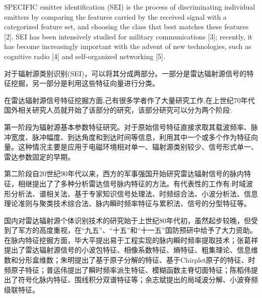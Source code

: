 SPECIFIC emitter identification (SEI) is the process of discriminating individual emitters by comparing the features carried by the received signal with a categorized feature set, and choosing the class that best matches these features [2].
SEI has been intensively studied for military communications [3]; recently, it has become increasingly important with the advent of new technologies, such as cognitive radio [4] and self-organized networking [5].


对于辐射源类别识别(SEI)，可以将其分成两部分。一部分是雷达辐射源信号的特征挖掘，另一部分是利用这些特征向量进行分类。

在雷达辐射源信号特征挖掘方面,己有很多学者作了大量研究工作,在上世纪70年代国外相关研究人员就开始了该部分的研究\cite{therrien1974application}，该部分研究可以分为两个阶段:

第一阶段为辐射源基本参数特征研究。对于原始信号特征直接求取其载波频率、脉冲宽度、脉冲幅度、到达角度和到达时间等信息\cite{徐欣2001雷达截获系统实时信号分选处理技术研究}，利用其中一个或多个作为特征向量。这种情况主要是应用于电磁环境相对单一、辐射源类别较少、信号形式单一、雷达参数固定的早期。

第二阶段自20世纪90年代以来，西方的军事强国开始研究雷达辐射信号的脉内特征，相继提出了了多种分析雷达信号脉内特征的方法。有代表性的工作有:时域波形分析法\cite{roe1994real}、谱相关法\cite{jouny1995radar,zhang2001new}、基于专家知识信号处理法\cite{melvin2006knowledge,roe1990knowledge,capraro2006knowledge}、时频综合法\cite{rose1996emitter,chen1999joint,li2011quadratic,moraitakis2000feature}、小波分析法\cite{cohen2002importance}、信息理论准则与聚类技术综合法\cite{zhou1999combining}、脉内瞬时频率特征\cite{kawalec2004radar}与累积法\cite{aubry2011cumulants}、信号的分型特征等\cite{dudczyk2013identification,zhang2003fractal,dudczyk2013fractal}。

国内对雷达辐射源个体识别技术的研究始于上世纪80年代初，虽然起步较晚，但受到了军方的高度重视，在“九五”、“十五”和“十一五”国防预研中给予了大力资助。在脉内特征挖掘方面，毕大平提出易于工程实现的脉内瞬时频率提取技术\cite{毕大平2005基于瞬时频率的脉内调制识别技术}；张葛祥提出了雷达辐射源信号的小波包特征\cite{张葛祥2006基于小波包变换和特征选择的雷达辐射源信号识别}、相像系数特征\cite{张葛祥2005基于相像系数的雷达辐射源信号特征选择}、熵特征\cite{张葛祥2005基于熵特征的雷达辐射源信号识别}、粗集理论\cite{张葛祥2005基于粗集理论的雷达辐射源信号识别}、信息维数\cite{张葛祥2005雷达辐射源信号智能识别方法研究}和分形盒维数\cite{张葛祥2003雷达辐射源信号分形特征研究,张葛祥2004雷达辐射源信号脉内特征分析}；朱明提出了基于原子分解的特征\cite{朱明2007基于原子分解的辐射源信号二次特征提取}、基于Chirplet原子的特征、时频原子特征\cite{朱明2009一种基于}；普运伟提出了瞬时频率派生特征\cite{普运伟2009雷达辐射源信号瞬时频率派生特征分类方法}、模糊函数主脊切面特征\cite{普运伟2008雷达辐射源信号模糊函数主脊切面特征提取方法}；陈稻伟提出了符号化脉内特征\cite{陈韬伟2008雷达辐射源信号符号化脉内特征提取方法}、围线积分双谱特征\cite{陈韬伟2013基于围线积分双谱的雷达辐射源信号个体特征提取}等；余志斌提出的局域波分解\cite{余志斌2008基于局域波分解的雷达辐射源信号时频分析}、小波脊频级联特征\cite{余志斌2010一种新的,余志斌2010基于小波脊频级联特征的雷达辐射源信号识别}。

